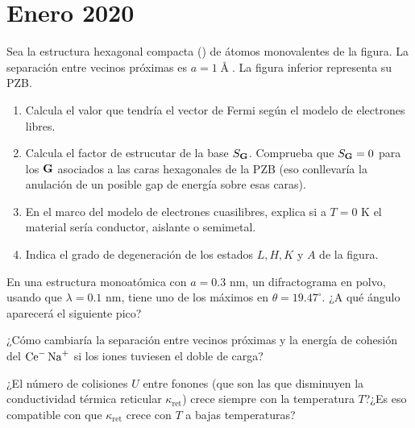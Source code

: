 \newpage


\section*{Enero 2020}
\setcounter{section}{3} %

\begin{ejercicio}
	Sea la estructura hexagonal compacta (\hcp) de átomos monovalentes de la figura. La separación entre vecinos próximas es $a=1\unit{\Angstrom}$. La figura inferior representa su PZB.
	\begin{enumerate}[label=\alph*)]
		\item Calcula el valor que tendría el vector de Fermi según el modelo de electrones libres.
		\item Calcula el factor de estrucutar de la base $S_{\mathbf{G}}$. Comprueba que $S_{\mathbf{G}}=0$ para los $\mathbf{G}$ asociados a las caras hexagonales de la PZB (eso conllevaría la anulación de un posible gap de energía sobre esas caras).
		\item En el marco del modelo de electrones cuasilibres, explica si a $T=0$ K el material sería conductor, aislante o semimetal.
		\item Indica el grado de degeneración de los estados $L,H,K$ y $A$ de la figura.
	\end{enumerate}
\end{ejercicio}

\begin{ejercicio}
	En una estructura \fcc monoatómica con $a=0.3$ nm, un difractograma en polvo, usando que $\lambda=0.1$ nm, tiene uno de los máximos en $\theta=19.47^\circ$. ¿A qué ángulo aparecerá el siguiente pico?
\end{ejercicio}

\begin{ejercicio}
	¿Cómo cambiaría la separación entre vecinos próximas y la energía de cohesión del $\ce{Ce^- Na^+}$ si los iones tuviesen el doble de carga?
\end{ejercicio}

\begin{ejercicio}
	¿El número de colisiones $U$ entre fonones (que son las que disminuyen la conductividad térmica reticular $\kappa_{\text{ret}}$) crece siempre con la temperatura $T$?¿Es eso compatible con que $\kappa_{\text{ret}}$ crece con $T$ a bajas temperaturas?
\end{ejercicio}

